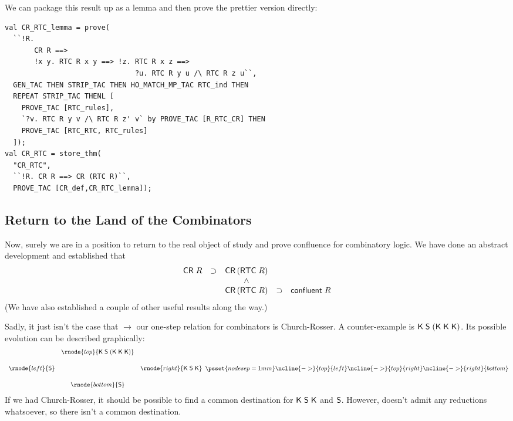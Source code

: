 \documentclass[12pt]{article}
\newcommand{\KC}{\con{K}}
\newcommand{\SC}{\con{S}}
\begin{document}
We can package this result up as a lemma and then prove the prettier
version directly:
\begin{session}\begin{verbatim}
val CR_RTC_lemma = prove(
  ``!R.
       CR R ==>
       !x y. RTC R x y ==> !z. RTC R x z ==>
                               ?u. RTC R y u /\ RTC R z u``,
  GEN_TAC THEN STRIP_TAC THEN HO_MATCH_MP_TAC RTC_ind THEN
  REPEAT STRIP_TAC THENL [
    PROVE_TAC [RTC_rules],
    `?v. RTC R y v /\ RTC R z' v` by PROVE_TAC [R_RTC_CR] THEN
    PROVE_TAC [RTC_RTC, RTC_rules]
  ]);
val CR_RTC = store_thm(
  "CR_RTC",
  ``!R. CR R ==> CR (RTC R)``,
  PROVE_TAC [CR_def,CR_RTC_lemma]);
\end{verbatim}\end{session}


\subsection{Return to the Land of the Combinators}
\label{sec:Return-to-Land}

Now, surely we are in a position to return to the real object of study
and prove confluence for combinatory logic.  We have done an abstract
development and established that\[
\begin{array}{ccccc}
{\sf CR}\;R & \supset & {\sf CR}\,({\sf RTC}\;R)\\
& & \land\\
& & {\sf CR}\,({\sf RTC}\;R) & \supset & {\sf confluent}\;R\\
\end{array}
\]  (We have also established a couple of other useful results along
the way.)

\newcommand{\topk}{\KC\;\SC\;(\KC\;\KC\;\KC)} Sadly, it just isn't
the case that $\rightarrow$ our one-step relation for combinators is
Church-Rosser.  A counter-example is $\topk$.  Its possible evolution
can be described graphically: \[
\begin{array}{ccc}
& \rnode{top}{\topk}\\[5mm]
\rnode{left}{\SC} & & \rnode{right}{\KC\;\SC\;\KC}\\[5mm]
& \rnode{bottom}{\SC}
\end{array}
\psset{nodesep=1mm}
\ncline{->}{top}{left}
\ncline{->}{top}{right}
\ncline{->}{right}{bottom}
\]
If we had Church-Rosser, it should be possible to find a common
destination for $\KC\;\SC\;\KC$ and $\SC$.  However, \SC{} doesn't
admit any reductions whatsoever, so there isn't a common destination.
\end{document}
